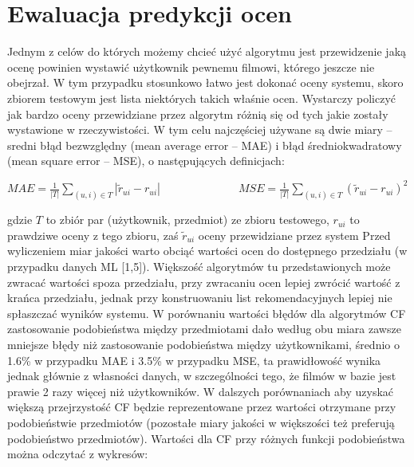 \documentclass{pracamgr}
\begin{document}
  \section{Ewaluacja predykcji ocen}
   Jednym z celów do których możemy chcieć użyć algorytmu jest przewidzenie jaką ocenę powinien wystawić użytkownik pewnemu filmowi, którego jeszcze nie obejrzał.
   W tym przypadku stosunkowo łatwo jest dokonać oceny systemu, skoro zbiorem testowym jest lista niektórych takich właśnie ocen.
   Wystarczy policzyć jak bardzo oceny przewidziane przez algorytm różnią się od tych jakie zostały wystawione w rzeczywistości.
   W tym celu najczęściej używane są dwie miary -- sredni błąd bezwzględny (mean average error -- MAE) i błąd średniokwadratowy (mean square error -- MSE),
   o następujących definicjach:\newline
   \begin{center}
    $
    MAE=\frac{1}{|T|}\sum\limits_{(u,i)\in T}|\tilde{r}_{ui}-r_{ui}|\quad\quad\quad\quad\quad\quad\quad
    MSE=\frac{1}{|T|}\sum\limits_{(u,i)\in T}(\tilde{r}_{ui}-r_{ui})^2
    $
   \end{center}
   {\scriptsize
    gdzie $T$ to zbiór par (użytkownik, przedmiot) ze zbioru testowego, $r_{ui}$ to prawdziwe oceny z tego zbioru,\newline
    zaś $\tilde{r}_{ui}$ oceny przewidziane przez system
   }\newline
   Przed wyliczeniem miar jakości warto obciąć wartości ocen do dostępnego przedziału (w przypadku danych ML [1,5]).%
   Większość algorytmów tu przedstawionych może zwracać wartości spoza przedziału, przy zwracaniu ocen lepiej zwrócić wartość z krańca przedziału,
   jednak przy konstruowaniu list rekomendacyjnych lepiej nie spłaszczać wyników systemu.
   W porównaniu wartości błędów dla algorytmów CF zastosowanie podobieństwa między przedmiotami dało według obu miara zawsze mniejsze błędy
   niż zastosowanie podobieństwa między użytkownikami, średnio o 1.6\% w przypadku MAE i 3.5\% w przypadku MSE, ta prawidłowość wynika jednak głównie
   z własności danych, w szczególności tego, że filmów w bazie jest prawie 2 razy więcej niż użytkowników. W dalszych porównaniach aby uzyskać większą
   przejrzystość CF będzie reprezentowane przez wartości otrzymane przy podobieństwie przedmiotów
   (pozostałe miary jakości w większości też preferują podobieństwo przedmiotów).
   Wartości dla CF przy różnych funkcji podobieństwa można odczytać z wykresów:
\end{document}
